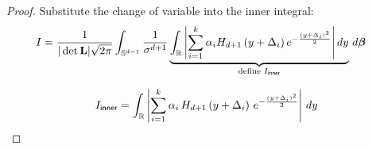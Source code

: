 \begin{proof}
Substitute the change of variable into the inner integral:
\begin{align}
I &= \frac{1}{|\det \mathbf{L}| \sqrt{2\pi}} \int_{\mathbb{S}^{d-1}} \frac{1}{\sigma^{d+1}} \underbrace{\int_{\mathbb{R}} \left| \sum_{i=1}^k \alpha_i H_{d+1}\left( y + \Delta_i \right) e^{ -\frac{(y + \Delta_i)^2}{2} } \right| dy }_{\text{define $I_{\textsf{inner}}$}}\, d\bm{\beta} \label{eq:transformed_I}
\end{align}

\[I_{\textsf{inner}} = \int_{\mathbb{R}} \left| \sum_{i=1}^k \alpha_i \, H_{d+1}\left( y + \Delta_i \right) \, e^{ -\frac{(y + \Delta_i)^2}{2} } \right| \, dy
\]
\end{proof}
